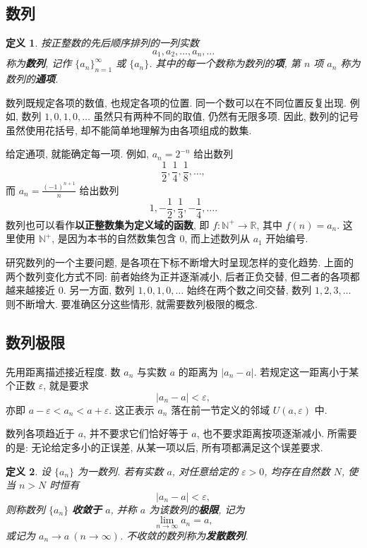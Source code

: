\documentclass[UTF8,openany]{ctexbook}
\theoremstyle{chinesetextbook}
\newtheorem{definition}{定义}[section]
\begin{document}
\subsection{数列}

\begin{definition}
按正整数的先后顺序排列的一列实数
\[
a_1,a_2,\ldots,a_n,\ldots
\]
称为\textbf{数列}, 记作 $\{a_n\}_{n=1}^{\infty}$ 或 $\{a_n\}$. 其中的每一个数称为数列的\textbf{项}, 第 $n$ 项 $a_n$ 称为数列的\textbf{通项}.
\end{definition}

数列既规定各项的数值, 也规定各项的位置. 同一个数可以在不同位置反复出现. 例如, 数列 $1,0,1,0,\ldots$ 虽然只有两种不同的取值, 仍然有无限多项. 因此, 数列的记号虽然使用花括号, 却不能简单地理解为由各项组成的数集.

给定通项, 就能确定每一项. 例如, $a_n=2^{-n}$ 给出数列
\[
\frac12,\frac14,\frac18,\ldots,
\]
而 $\displaystyle a_n=\frac{(-1)^{n+1}}{n}$ 给出数列
\[
1,-\frac12,\frac13,-\frac14,\ldots.
\]
数列也可以看作\textbf{以正整数集为定义域的函数}, 即 $f:\mathbb N^+\to\mathbb R$, 其中 $f(n)=a_n$. 这里使用 $\mathbb N^+$, 是因为本书的自然数集包含 $0$, 而上述数列从 $a_1$ 开始编号.

研究数列的一个主要问题, 是各项在下标不断增大时呈现怎样的变化趋势. 上面的两个数列变化方式不同: 前者始终为正并逐渐减小, 后者正负交替, 但二者的各项都越来越接近 $0$. 另一方面, 数列 $1,0,1,0,\ldots$ 始终在两个数之间交替, 数列 $1,2,3,\ldots$ 则不断增大. 要准确区分这些情形, 就需要数列极限的概念.

\subsection{数列极限}

先用距离描述接近程度. 数 $a_n$ 与实数 $a$ 的距离为 $|a_n-a|$. 若规定这一距离小于某个正数 $\varepsilon$, 就是要求
\[
|a_n-a|<\varepsilon,
\]
亦即 $a-\varepsilon<a_n<a+\varepsilon$. 这正表示 $a_n$ 落在前一节定义的邻域 $U(a,\varepsilon)$ 中.

数列各项趋近于 $a$, 并不要求它们恰好等于 $a$, 也不要求距离按项逐渐减小. 所需要的是: 无论给定多小的正误差, 从某一项以后, 所有项都满足这个误差要求.

\begin{definition}
设 $\{a_n\}$ 为一数列. 若有实数 $a$, 对任意给定的 $\varepsilon>0$, 均存在自然数 $N$, 使当 $n>N$ 时恒有
\[
|a_n-a|<\varepsilon,
\]
则称数列 $\{a_n\}$ \textbf{收敛于} $a$, 并称 $a$ 为该数列的\textbf{极限}, 记为
\[
\lim_{n\to\infty}a_n=a,
\]
或记为 $a_n\to a\ (n\to\infty)$. 不收敛的数列称为\textbf{发散数列}.
\end{definition}
\end{document}

